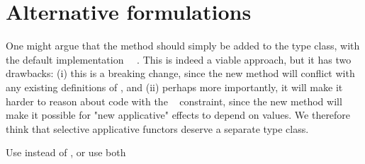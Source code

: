 \section{Alternative formulations}\label{sec-alternatives}

One might argue that the  method should simply be added to the
 type class, with the default implementation
~\hs{=}~. This is indeed a viable approach, but it has
two drawbacks: (i) this is a breaking change, since the new method will conflict
with any existing definitions of , and (ii) perhaps more importantly,
it will make it harder to reason about code with the ~
constraint, since the new method will make it possible for "new applicative"
effects to depend on values. We therefore think that selective applicative
functors deserve a separate type class.

Use  instead of , or use both


